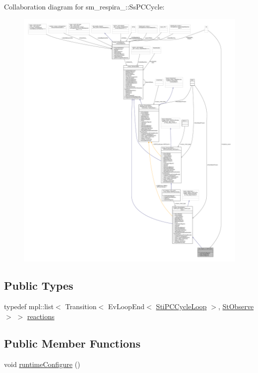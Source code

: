 Collaboration diagram for sm\+\_\+respira\+\_\+:\+:Ss\+P\+C\+Cycle\+:
\nopagebreak
\begin{figure}[H]
\begin{center}
\leavevmode
\includegraphics[width=350pt]{structsm__respira__1_1_1SsPCCycle__coll__graph}
\end{center}
\end{figure}
\subsection*{Public Types}
\begin{DoxyCompactItemize}
\item 
typedef mpl\+::list$<$ Transition$<$ Ev\+Loop\+End$<$ \hyperlink{structsm__respira__1_1_1pc__cycle__inner__states_1_1StiPCCycleLoop}{Sti\+P\+C\+Cycle\+Loop} $>$, \hyperlink{structsm__respira__1_1_1StObserve}{St\+Observe} $>$ $>$ \hyperlink{structsm__respira__1_1_1SsPCCycle_a50a87951711af774225321a17085c702}{reactions}
\end{DoxyCompactItemize}
\subsection*{Public Member Functions}
\begin{DoxyCompactItemize}
\item 
void \hyperlink{structsm__respira__1_1_1SsPCCycle_abebc628f6a1cb68b34f7f104d4232e11}{runtime\+Configure} ()
\end{DoxyCompactItemize}
